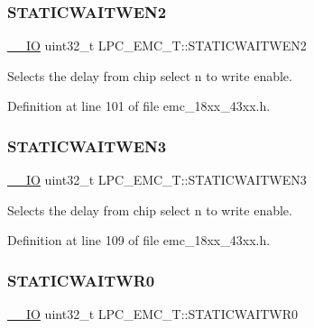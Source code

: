 \subsubsection{\texorpdfstring{S\+T\+A\+T\+I\+C\+W\+A\+I\+T\+W\+E\+N2}{STATICWAITWEN2}}
{\footnotesize\ttfamily \hyperlink{core__sc300_8h_aec43007d9998a0a0e01faede4133d6be}{\+\_\+\+\_\+\+IO} uint32\+\_\+t L\+P\+C\+\_\+\+E\+M\+C\+\_\+\+T\+::\+S\+T\+A\+T\+I\+C\+W\+A\+I\+T\+W\+E\+N2}

Selects the delay from chip select n to write enable. 

Definition at line 101 of file emc\+\_\+18xx\+\_\+43xx.\+h.

\mbox{\label{struct_l_p_c___e_m_c___t_ac0d06fb913c952b535e30327c6a6f21f}} 
\subsubsection{\texorpdfstring{S\+T\+A\+T\+I\+C\+W\+A\+I\+T\+W\+E\+N3}{STATICWAITWEN3}}
{\footnotesize\ttfamily \hyperlink{core__sc300_8h_aec43007d9998a0a0e01faede4133d6be}{\+\_\+\+\_\+\+IO} uint32\+\_\+t L\+P\+C\+\_\+\+E\+M\+C\+\_\+\+T\+::\+S\+T\+A\+T\+I\+C\+W\+A\+I\+T\+W\+E\+N3}

Selects the delay from chip select n to write enable. 

Definition at line 109 of file emc\+\_\+18xx\+\_\+43xx.\+h.

\mbox{\label{struct_l_p_c___e_m_c___t_a6d0d1c3740ff59b75c651a7846f04b4a}} 
\subsubsection{\texorpdfstring{S\+T\+A\+T\+I\+C\+W\+A\+I\+T\+W\+R0}{STATICWAITWR0}}
{\footnotesize\ttfamily \hyperlink{core__sc300_8h_aec43007d9998a0a0e01faede4133d6be}{\+\_\+\+\_\+\+IO} uint32\+\_\+t L\+P\+C\+\_\+\+E\+M\+C\+\_\+\+T\+::\+S\+T\+A\+T\+I\+C\+W\+A\+I\+T\+W\+R0}

